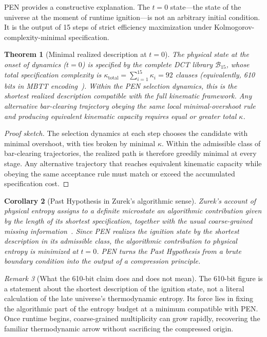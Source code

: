 \documentclass[11pt,a4paper]{article}
\theoremstyle{plain}
\newtheorem{theorem}{Theorem}[section]
\newtheorem{corollary}[theorem]{Corollary}
\theoremstyle{definition}
\theoremstyle{remark}
\newtheorem{remark}[theorem]{Remark}
\newcommand{\B}{\mathcal{B}}
\begin{document}
PEN provides a constructive explanation.  The $t = 0$ state---the state of the universe at the moment of runtime ignition---is not an arbitrary initial condition.  It is the output of 15 steps of strict efficiency maximization under Kolmogorov-complexity-minimal specification.

\begin{theorem}[Minimal realized description at $t = 0$]
\label{thm:past-hypothesis}
The physical state at the onset of dynamics ($t = 0$) is specified by the complete DCT library $\B_{15}$, whose total specification complexity is $\kappa_{\mathrm{total}} = \sum_{i=1}^{15} \kappa_i = 92$ clauses (equivalently, 610 bits in MBTT encoding~\cite{pen2026}).  Within the PEN selection dynamics, this is the shortest realized description compatible with the full kinematic framework.  Any alternative bar-clearing trajectory obeying the same local minimal-overshoot rule and producing equivalent kinematic capacity requires equal or greater total $\kappa$.
\end{theorem}

\begin{proof}[Proof sketch]
The selection dynamics at each step chooses the candidate with minimal overshoot, with ties broken by minimal $\kappa$.  Within the admissible class of bar-clearing trajectories, the realized path is therefore greedily minimal at every stage.  Any alternative trajectory that reaches equivalent kinematic capacity while obeying the same acceptance rule must match or exceed the accumulated specification cost.
\end{proof}

\begin{corollary}[Past Hypothesis in Zurek's algorithmic sense]
\label{cor:zurek}
Zurek's account of physical entropy assigns to a definite microstate an algorithmic contribution given by the length of its shortest specification, together with the usual coarse-grained missing information~\cite{zurek1989}.  Since PEN realizes the ignition state by the shortest description in its admissible class, the algorithmic contribution to physical entropy is minimized at $t = 0$.  PEN turns the Past Hypothesis from a brute boundary condition into the output of a compression principle.
\end{corollary}

\begin{remark}[What the 610-bit claim does and does not mean]
The 610-bit figure is a statement about the shortest description of the ignition state, not a literal calculation of the late universe's thermodynamic entropy.  Its force lies in fixing the algorithmic part of the entropy budget at a minimum compatible with PEN.  Once runtime begins, coarse-grained multiplicity can grow rapidly, recovering the familiar thermodynamic arrow without sacrificing the compressed origin.
\end{remark}
\end{document}
